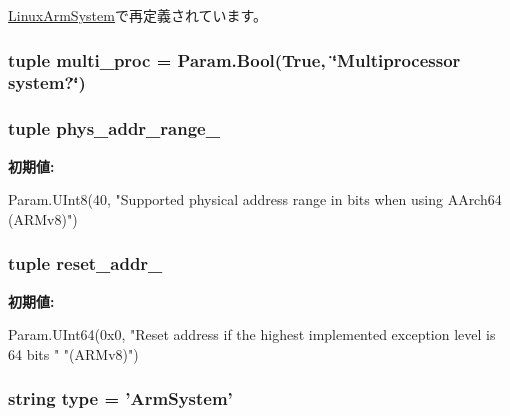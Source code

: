 \hyperlink{classArmSystem_1_1LinuxArmSystem_abd9c5cc6b7da624a69344d571bab1038}{LinuxArmSystem}で再定義されています。\hypertarget{classArmSystem_1_1ArmSystem_a406eef435fa7bd49bc7c48deba06068a}{
\subsubsection[{multi\_\-proc}]{\setlength{\rightskip}{0pt plus 5cm}tuple multi\_\-proc = Param.Bool(True, \char`\"{}Multiprocessor system?\char`\"{})}}
\label{classArmSystem_1_1ArmSystem_a406eef435fa7bd49bc7c48deba06068a}
\hypertarget{classArmSystem_1_1ArmSystem_a5d15b93d3810eb55745bb4d63895a4e6}{
\subsubsection[{phys\_\-addr\_\-range\_\-64}]{\setlength{\rightskip}{0pt plus 5cm}tuple phys\_\-addr\_\-range\_}}
\label{classArmSystem_1_1ArmSystem_a5d15b93d3810eb55745bb4d63895a4e6}
{\bfseries 初期値:}
\begin{DoxyCode}
Param.UInt8(40,
        "Supported physical address range in bits when using AArch64 (ARMv8)")
\end{DoxyCode}
\hypertarget{classArmSystem_1_1ArmSystem_a35ec37e4cfef612ea6ab758b446c80de}{
\subsubsection[{reset\_\-addr\_\-64}]{\setlength{\rightskip}{0pt plus 5cm}tuple reset\_\-addr\_}}
\label{classArmSystem_1_1ArmSystem_a35ec37e4cfef612ea6ab758b446c80de}
{\bfseries 初期値:}
\begin{DoxyCode}
Param.UInt64(0x0,
        "Reset address if the highest implemented exception level is 64 bits "
        "(ARMv8)")
\end{DoxyCode}
\hypertarget{classArmSystem_1_1ArmSystem_acce15679d830831b0bbe8ebc2a60b2ca}{
\subsubsection[{type}]{\setlength{\rightskip}{0pt plus 5cm}string type = '{\bf ArmSystem}'}}
\label{classArmSystem_1_1ArmSystem_acce15679d830831b0bbe8ebc2a60b2ca}


